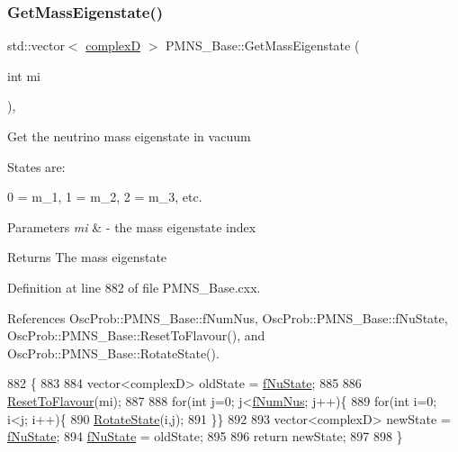 \subsubsection{\texorpdfstring{Get\+Mass\+Eigenstate()}{GetMassEigenstate()}}
{\footnotesize\ttfamily std\+::vector$<$ \hyperlink{EigenPoint_8h_a67ca8e107e20610c3fff78d5e726ece0}{complexD} $>$ P\+M\+N\+S\+\_\+\+Base\+::\+Get\+Mass\+Eigenstate (\begin{DoxyParamCaption}\item[{int}]{mi }\end{DoxyParamCaption})\hspace{0.3cm}{\ttfamily [virtual]}, {\ttfamily [inherited]}}

Get the neutrino mass eigenstate in vacuum

States are\+: 
\begin{DoxyPre}
  0 = m\_1, 1 = m\_2, 2 = m\_3, etc.
\end{DoxyPre}
 
\begin{DoxyParams}{Parameters}
{\em mi} & -\/ the mass eigenstate index\\
\hline
\end{DoxyParams}
\begin{DoxyReturn}{Returns}
The mass eigenstate 
\end{DoxyReturn}


Definition at line 882 of file P\+M\+N\+S\+\_\+\+Base.\+cxx.



References Osc\+Prob\+::\+P\+M\+N\+S\+\_\+\+Base\+::f\+Num\+Nus, Osc\+Prob\+::\+P\+M\+N\+S\+\_\+\+Base\+::f\+Nu\+State, Osc\+Prob\+::\+P\+M\+N\+S\+\_\+\+Base\+::\+Reset\+To\+Flavour(), and Osc\+Prob\+::\+P\+M\+N\+S\+\_\+\+Base\+::\+Rotate\+State().


\begin{DoxyCode}
882                                                       \{
883 
884   vector<complexD> oldState = \hyperlink{classOscProb_1_1PMNS__Base_abf99f2339e3ee989600740b5d88063e8}{fNuState};
885 
886   \hyperlink{classOscProb_1_1PMNS__Base_ac0d4bf8ff1318ef96d3dafa62e0cec25}{ResetToFlavour}(mi);
887   
888   \textcolor{keywordflow}{for}(\textcolor{keywordtype}{int} j=0; j<\hyperlink{classOscProb_1_1PMNS__Base_a24bb74bed63569dfe88b18fa6a08060e}{fNumNus}; j++)\{
889   \textcolor{keywordflow}{for}(\textcolor{keywordtype}{int} i=0; i<j; i++)\{
890     \hyperlink{classOscProb_1_1PMNS__Base_ae52554477ad3250daa5adb8c32cab0b4}{RotateState}(i,j);
891   \}\}
892 
893   vector<complexD> newState = \hyperlink{classOscProb_1_1PMNS__Base_abf99f2339e3ee989600740b5d88063e8}{fNuState};
894   \hyperlink{classOscProb_1_1PMNS__Base_abf99f2339e3ee989600740b5d88063e8}{fNuState} = oldState;
895   
896   \textcolor{keywordflow}{return} newState;
897   
898 \}
\end{DoxyCode}
\mbox{\label{classOscProb_1_1PMNS__Base_ac8e196f2e85a2b1caaf705073ee95a5c}} 
